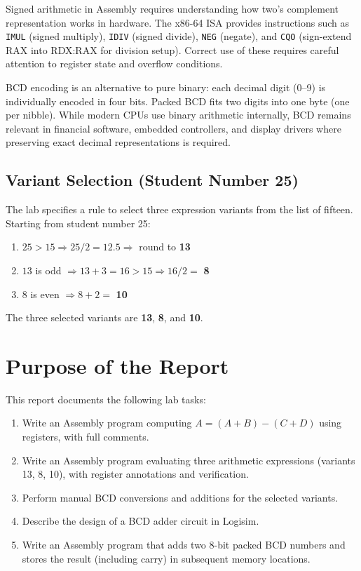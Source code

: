 \documentclass[12pt,a4paper]{article}
\newcommand{\code}[1]{\texttt{\small #1}}
\begin{document}
Signed arithmetic in Assembly requires understanding how two's complement
representation works in hardware. The x86-64 ISA provides instructions such as
\code{IMUL} (signed multiply), \code{IDIV} (signed divide), \code{NEG} (negate),
and \code{CQO} (sign-extend RAX into RDX:RAX for division setup). Correct use
of these requires careful attention to register state and overflow conditions.

BCD encoding is an alternative to pure binary: each decimal digit (0--9) is
individually encoded in four bits. Packed BCD fits two digits into one byte
(one per nibble). While modern CPUs use binary arithmetic internally, BCD
remains relevant in financial software, embedded controllers, and display
drivers where preserving exact decimal representations is required.

\subsection{Variant Selection (Student Number 25)}

The lab specifies a rule to select three expression variants from the list of
fifteen. Starting from student number 25:

\begin{enumerate}
  \item $25 > 15 \Rightarrow 25 / 2 = 12.5 \Rightarrow$ round to \textbf{13}
  \item $13$ is odd $\Rightarrow 13 + 3 = 16 > 15 \Rightarrow 16 / 2 = $ \textbf{8}
  \item $8$ is even $\Rightarrow 8 + 2 = $ \textbf{10}
\end{enumerate}

The three selected variants are \textbf{13}, \textbf{8}, and \textbf{10}.

\newpage

\section{Purpose of the Report}

This report documents the following lab tasks:

\begin{enumerate}
  \item Write an Assembly program computing $A = (A + B) - (C + D)$ using
        registers, with full comments.
  \item Write an Assembly program evaluating three arithmetic expressions
        (variants 13, 8, 10), with register annotations and verification.
  \item Perform manual BCD conversions and additions for the selected variants.
  \item Describe the design of a BCD adder circuit in Logisim.
  \item Write an Assembly program that adds two 8-bit packed BCD numbers and
        stores the result (including carry) in subsequent memory locations.
\end{enumerate}
\end{document}
